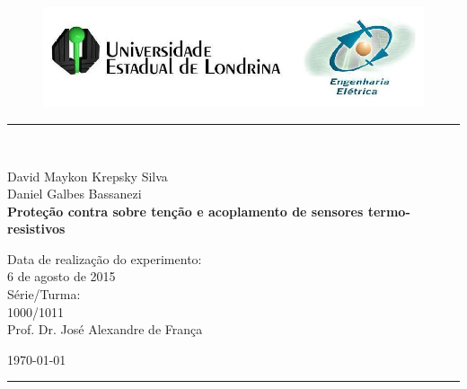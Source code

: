 \begin{titlepage}
\begin{center}
\begin{figure}[h]
\includegraphics[scale=0.76]{img/topdotitulo.png}
\end{figure}
\rule{\columnwidth}{1.5mm}
\

\large David Maykon Krepsky Silva\\
\large Daniel Galbes Bassanezi\\

\vspace{4cm}
{\bf \Large Proteção contra sobre tenção e acoplamento de sensores termo-resistivos}
\vspace{3.5cm}

\begin{flushright}
Data de realização do experimento:\\
6 de agosto de 2015\\
Série/Turma:\\
1000/1011\\
Prof. Dr. José Alexandre de França
\end{flushright}

\vspace{3.2cm}
\today

\rule{\columnwidth}{1.3mm}
\end{center}
\end{titlepage}
\blankpage